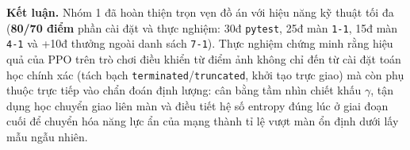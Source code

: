 \documentclass[a4paper,10pt]{article}
\begin{document}
\noindent\textbf{Kết luận.} Nhóm 1 đã hoàn thiện trọn vẹn đồ án với hiệu năng kỹ thuật tối đa (\textbf{80/70 điểm} phần cài đặt và thực nghiệm: 30đ \texttt{pytest}, 25đ màn \texttt{1-1}, 15đ màn \texttt{4-1} và +10đ thưởng ngoài danh sách \texttt{7-1}). Thực nghiệm chứng minh rằng hiệu quả của PPO trên trò chơi điều khiển từ điểm ảnh không chỉ đến từ cài đặt toán học chính xác (tách bạch \texttt{terminated}/\texttt{truncated}, khởi tạo trực giao) mà còn phụ thuộc trực tiếp vào chẩn đoán định lượng: cân bằng tầm nhìn chiết khấu $\gamma$, tận dụng học chuyển giao liên màn và điều tiết hệ số entropy đúng lúc ở giai đoạn cuối để chuyển hóa năng lực ẩn của mạng thành tỉ lệ vượt màn ổn định dưới lấy mẫu ngẫu nhiên.
\end{document}
